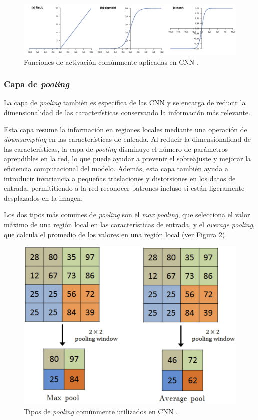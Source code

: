 \begin{figure}[h]
	\centering
	\includegraphics[scale=0.55]{imagenes/cap2/activation.png}
	\caption[Funciones de activación comunes.]{Funciones de activación comúnmente aplicadas en CNN \cite{40}.}
	\label{fig8}
\end{figure}

\subsubsection*{Capa de \textit{pooling}}
La capa de \textit{pooling} también es específica de las CNN y se encarga de reducir la dimensionalidad de las características conservando la información más relevante.

Esta capa resume la información en regiones locales mediante una operación de \textit{downsampling} en las características de entrada. Al reducir la dimensionalidad de las características, la capa de \textit{pooling} disminuye el número de parámetros aprendibles en la red, lo que puede ayudar a prevenir el sobreajuste y mejorar la eficiencia computacional del modelo. Además, esta capa también ayuda a introducir invariancia a pequeñas traslaciones y distorsiones en los datos de entrada, permititiendo a la red reconocer patrones incluso si están ligeramente desplazados en la imagen. 

Los dos tipos más comunes de \textit{pooling} son el \textit{max pooling}, que selecciona el valor máximo de una región local en las características de entrada, y el \textit{average pooling}, que calcula el promedio de los valores en una región local (ver Figura \ref{fig9}).

\begin{figure}[h]
	\centering
	\includegraphics[scale=0.55]{imagenes/cap2/pooling.png}
	\caption[Tipos de \textit{pooling} comunes.]{Tipos de \textit{pooling} comúnmente utilizados en CNN \cite{40}.}
	\label{fig9}
\end{figure}

